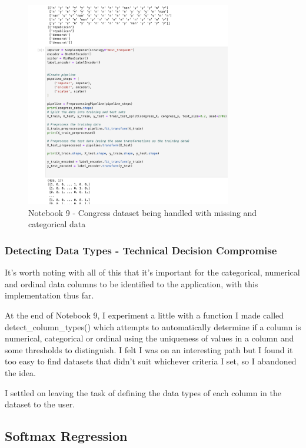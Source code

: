 \documentclass[letterpaper,10pt]{article}
\begin{document}
\begin{figure}[ht]
    \centering
    \includegraphics[width=0.8\textwidth]{notebook_9_excerpt.png}
    \caption{Notebook 9 - Congress dataset being handled with missing and categorical data}
    \label{fig:notebook_9}
\end{figure}

\subsubsection{Detecting Data Types - Technical Decision Compromise}

It's worth noting with all of this that it's important for the categorical, numerical and ordinal data columns to be identified to the application, with this implementation thus far. \par
At the end of Notebook 9, I experiment a little with a function I made called detect\_column\_types() which attempts to automatically determine if a column is numerical, categorical or ordinal using the uniqueness of values in a column and some thresholds to distinguish. I felt I was on an interesting path but I found it too easy to find datasets that didn't suit whichever criteria I set, so I abandoned the idea. \par
I settled on leaving the task of defining the data types of each column in the dataset to the user. \par

\subsection{Softmax Regression}
\end{document}
